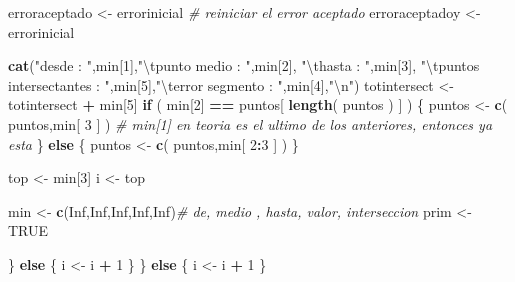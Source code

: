 \documentclass[]{article}
\newenvironment{Shaded}{\begin{snugshade}}{\end{snugshade}}
\newcommand{\KeywordTok}[1]{\textcolor[rgb]{0.13,0.29,0.53}{\textbf{#1}}}
\newcommand{\DecValTok}[1]{\textcolor[rgb]{0.00,0.00,0.81}{#1}}
\newcommand{\CharTok}[1]{\textcolor[rgb]{0.31,0.60,0.02}{#1}}
\newcommand{\StringTok}[1]{\textcolor[rgb]{0.31,0.60,0.02}{#1}}
\newcommand{\CommentTok}[1]{\textcolor[rgb]{0.56,0.35,0.01}{\textit{#1}}}
\newcommand{\OtherTok}[1]{\textcolor[rgb]{0.56,0.35,0.01}{#1}}
\newcommand{\ControlFlowTok}[1]{\textcolor[rgb]{0.13,0.29,0.53}{\textbf{#1}}}
\newcommand{\OperatorTok}[1]{\textcolor[rgb]{0.81,0.36,0.00}{\textbf{#1}}}
\newcommand{\NormalTok}[1]{#1}
\begin{document}
\begin{Shaded}
\begin{Highlighting}[]
\NormalTok{        erroraceptado  <-}\StringTok{ }\NormalTok{errorinicial }\CommentTok{# reiniciar el error aceptado}
\NormalTok{        erroraceptadoy <-}\StringTok{ }\NormalTok{errorinicial }
        
        \KeywordTok{cat}\NormalTok{(}\StringTok{"desde : "}\NormalTok{,min[}\DecValTok{1}\NormalTok{],}\StringTok{"}\CharTok{\textbackslash{}t}\StringTok{punto medio : "}\NormalTok{,min[}\DecValTok{2}\NormalTok{], }\StringTok{"}\CharTok{\textbackslash{}t}\StringTok{hasta : "}\NormalTok{,min[}\DecValTok{3}\NormalTok{], }\StringTok{"}\CharTok{\textbackslash{}t}\StringTok{puntos intersectantes : "}\NormalTok{,min[}\DecValTok{5}\NormalTok{],}\StringTok{"}\CharTok{\textbackslash{}t}\StringTok{error segmento : "}\NormalTok{,min[}\DecValTok{4}\NormalTok{],}\StringTok{"}\CharTok{\textbackslash{}n}\StringTok{"}\NormalTok{)}
\NormalTok{        totintersect <-}\StringTok{ }\NormalTok{totintersect }\OperatorTok{+}\StringTok{ }\NormalTok{min[}\DecValTok{5}\NormalTok{]}
        \ControlFlowTok{if}\NormalTok{ ( min[}\DecValTok{2}\NormalTok{] }\OperatorTok{==}\StringTok{ }\NormalTok{puntos[ }\KeywordTok{length}\NormalTok{( puntos ) ] ) }
\NormalTok{        \{}
\NormalTok{          puntos <-}\StringTok{ }\KeywordTok{c}\NormalTok{( puntos,min[ }\DecValTok{3}\NormalTok{ ] ) }\CommentTok{# min[1] en teoria es el ultimo de los anteriores, entonces ya esta }
\NormalTok{        \}}
        \ControlFlowTok{else}
\NormalTok{        \{}
\NormalTok{          puntos <-}\StringTok{ }\KeywordTok{c}\NormalTok{( puntos,min[ }\DecValTok{2}\OperatorTok{:}\DecValTok{3}\NormalTok{ ] )}
\NormalTok{        \}}
        
\NormalTok{        top <-}\StringTok{ }\NormalTok{min[}\DecValTok{3}\NormalTok{]}
\NormalTok{        i   <-}\StringTok{ }\NormalTok{top}
        
\NormalTok{        min  <-}\StringTok{ }\KeywordTok{c}\NormalTok{(}\OtherTok{Inf}\NormalTok{,}\OtherTok{Inf}\NormalTok{,}\OtherTok{Inf}\NormalTok{,}\OtherTok{Inf}\NormalTok{,}\OtherTok{Inf}\NormalTok{)}\CommentTok{# de, medio , hasta, valor, interseccion}
\NormalTok{        prim <-}\StringTok{ }\OtherTok{TRUE}
        

        
\NormalTok{      \}}
      \ControlFlowTok{else} 
\NormalTok{      \{}
\NormalTok{        i <-}\StringTok{ }\NormalTok{i }\OperatorTok{+}\StringTok{ }\DecValTok{1}  
\NormalTok{      \}}
\NormalTok{    \}}
    \ControlFlowTok{else} 
\NormalTok{    \{}
\NormalTok{      i <-}\StringTok{ }\NormalTok{i }\OperatorTok{+}\StringTok{ }\DecValTok{1}  
\NormalTok{    \}}
    

\end{Highlighting}
\end{Shaded}
\end{document}

